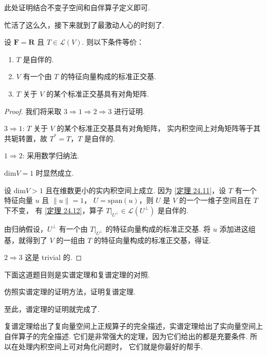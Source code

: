 此处证明结合不变子空间和自伴算子定义即可. 

忙活了这么久，接下来就到了最激动人心的时刻了. 

\begin{theorem} 
    设 $ \mathbf{F} = \mathbf{R} $ 且 $ T \in \mathcal{L}(V) $. 则以下条件等价：
    \begin{enumerate}
        \item $ T $ 是自伴的.
        
        \item $ V $ 有一个由 $ T $ 的特征向量构成的标准正交基.
        
        \item $ T $ 关于 $ V $ 的某个标准正交基具有对角矩阵. 
    \end{enumerate}
\end{theorem}

\begin{proof}
    我们将采取 $ 3 \Rightarrow 1 \Rightarrow 2 \Rightarrow 3 $ 进行证明. 

    $ 3 \Rightarrow 1 $: $ T $ 关于 $ V $ 的某个标准正交基具有对角矩阵，
    实内积空间上对角矩阵等于其共轭转置，故 $ T^* = T $，$ T $ 是自伴的. 

    $ 1 \Rightarrow 2 $: 采用数学归纳法. 
    
    $ \mathrm{dim}V = 1 $ 时显然成立. 
        
    设 $ \mathrm{dim}V > 1 $ 且在维数更小的实内积空间上成立. 
    因为 \ref{定理 24.11}，设 $ T $ 有一个特征向量 $ u $ 且 $ \lVert u \rVert = 1 $，
    $ U = \mathrm{span}(u) $，则 $ U $ 是 $ V $ 的一个一维子空间且在 $ T $ 下不变，
    有 \ref{定理 24.12}，算子 $ T|_{U^{\perp }} \in \mathcal{L}(U^{\perp }) $ 是自伴的. 
        
    由归纳假设，$ U^{\perp } $ 有一个由 $ T|_{U^{\perp }} $ 的特征向量构成的标准正交基. 
    将 $ u $ 添加进这组基，就得到了 $ V $ 的一组由 $ T $ 的特征向量构成的标准正交基，得证. 
    
    $ 2 \Rightarrow 3 $ 这是 trivial 的. 
\end{proof}

下面这道题目则是实谱定理和复谱定理的对照.  

\begin{example}
    仿照实谱定理的证明方法，证明复谱定理. 
\end{example}

至此，谱定理的证明就完成了. 

复谱定理给出了复向量空间上正规算子的完全描述，实谱定理给出了实向量空间上自伴算子的完全描述. 
它们是非常强大的定理，因为它们给出的都是充要条件. 所以在处理内积空间上可对角化问题时，
它们就是你最好的帮手. 


